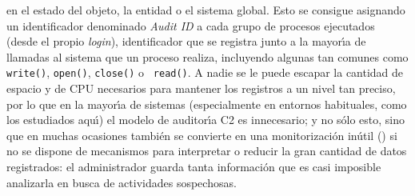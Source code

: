 en el estado del objeto, la entidad o el sistema global. Esto se consigue 
asignando un identificador denominado {\it Audit ID} a cada grupo de procesos
ejecutados (desde el propio {\it login}), identificador que se registra junto
a la mayor\'{\i}a de llamadas al sistema que un proceso realiza, incluyendo 
algunas tan comunes como {\tt write()}, {\tt open()}, {\tt close()} o {\tt
read()}. A nadie se le puede escapar la cantidad de espacio y de CPU necesarios 
para mantener los registros a un nivel tan preciso, por lo que en la 
mayor\'{\i}a de sistemas (especialmente en entornos habituales, como los 
estudiados aqu\'{\i}) el modelo de 
auditor\'{\i}a C2 es innecesario; y no s\'olo esto, sino que en muchas 
ocasiones tambi\'en se convierte en una monitorizaci\'on in\'util 
(\cite{kn:axe98}) si no se dispone de mecanismos
para interpretar o reducir la gran cantidad de datos registrados: el 
administrador guarda tanta informaci\'on que es casi imposible analizarla en
busca de actividades sospechosas.
